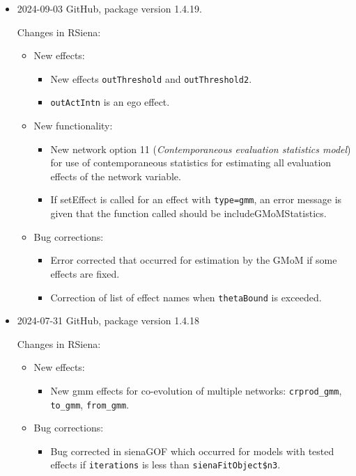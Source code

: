 \documentclass[a4paper,fleqn,11pt]{article}
\newcommand{\+}{\, + \,}
\newcommand{\sfn}[1]{\textsf{#1}}
\begin{document}
\begin{small}
\begin{itemize}
\item 2024-09-03 GitHub, package version 1.4.19.

Changes in RSiena:
\begin{itemize}
\item New effects:
   \begin{itemize}
  \item New effects \texttt{outThreshold} and \texttt{outThreshold2}.
  \item \texttt{outActIntn} is an ego effect.
    \end{itemize}
\item New functionality:
   \begin{itemize}
  \item New network option 11 
    (\emph{Contemporaneous evaluation statistics model}) for use of 
    contemporaneous statistics
    for estimating all evaluation effects of the network variable.
  \item If \sfn{setEffect} is called for an effect with \texttt{type=gmm}, an error message
    is given that the function called should be \sfn{includeGMoMStatistics}.
    \end{itemize}
\item Bug corrections:
   \begin{itemize}
  \item Error corrected that occurred for estimation by the GMoM if
    some effects are fixed.
  \item Correction of list of effect names when \texttt{thetaBound} is exceeded.
    \end{itemize}
\end{itemize}


\item 2024-07-31 GitHub, package version 1.4.18


Changes in RSiena:
\begin{itemize}
\item New effects:
   \begin{itemize}
  \item New gmm effects for co-evolution of multiple networks:
    \texttt{crprod\_gmm}, \texttt{to\_gmm}, \texttt{from\_gmm}.
    \end{itemize}
\item Bug corrections:
   \begin{itemize}
  \item Bug corrected in \sfn{sienaGOF} which occurred for models with tested effects
    if \texttt{iterations} is less than \texttt{sienaFitObject\$n3}.
    \end{itemize}
\end{itemize}



\end{itemize}
\end{small}
\end{document}
